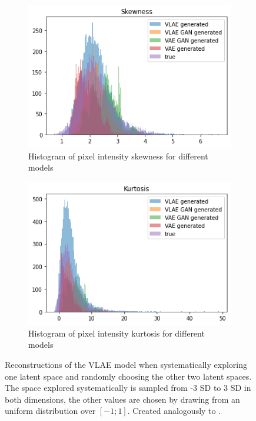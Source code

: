 \begin{figure}
    \begin{subfigure}{0.48\textwidth}
        \centering
        \includegraphics[width=\textwidth]{images/generated_vs_true/mnist_vs_models_skew.png}
        \caption{Histogram of pixel intensity skewness for different models}
        \label{subfig:skew_generated_vs_true}
    \end{subfigure}
    \hfill
    \begin{subfigure}{0.48\textwidth}
        \centering
        \includegraphics[width=\textwidth]{images/generated_vs_true/mnist_vs_models_kurt.png}
        \caption{Histogram of pixel intensity kurtosis for different models}
        \label{subfig:kurt_generated_vs_true}
    \end{subfigure}
    \caption{Reconstructions of the VLAE model when systematically exploring one latent space and randomly choosing the other two latent spaces. The space explored systematically is sampled from -3 SD to 3 SD in both dimensions, the other values are chosen by drawing from an uniform distribution over $[-1; 1]$. Created analogously to \citet[Figure 5]{zhao2017learning}.}
    \label{fig:mean_generated_vs_true}
\end{figure}

